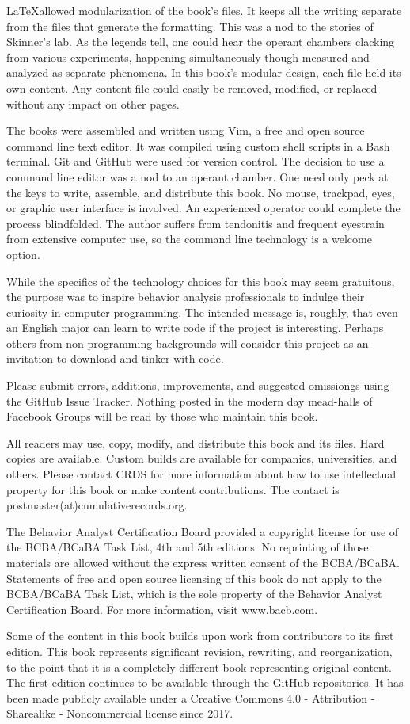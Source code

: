\LaTeX allowed modularization of the book's files. It keeps all the writing separate from the files that generate the formatting. This was a nod to the stories of Skinner's lab. As the legends tell, one could hear the operant chambers clacking from various experiments, happening simultaneously though measured and analyzed as separate phenomena. In this book's modular design, each file held its own content. Any content file could easily be removed, modified, or replaced without any impact on other pages.


The books were assembled and written using Vim, a free and open source command line text editor. It was compiled using custom shell scripts in a Bash terminal. Git and GitHub were used for version control. The decision to use a command line editor was a nod to an operant chamber. One need only peck at the keys to write, assemble, and distribute this book. No mouse, trackpad, eyes, or graphic user interface is involved. An experienced operator could complete the process blindfolded. The author suffers from tendonitis and frequent eyestrain from extensive computer use, so the command line technology is a welcome option.


While the specifics of the technology choices for this book may seem gratuitous, the purpose was to inspire behavior analysis professionals to indulge their curiosity in computer programming. The intended message is, roughly, that even an English major can learn to write code if the project is interesting. Perhaps others from non-programming backgrounds will consider this project as an invitation to download and tinker with code.

Please submit errors, additions, improvements, and suggested omissiongs using the GitHub Issue Tracker. Nothing posted in the modern day mead-halls of Facebook Groups will be read by those who maintain this book.

All readers may use, copy, modify, and distribute this book and its files. Hard copies are available. Custom builds are available for companies, universities, and others. Please contact CRDS for more information about how to use intellectual property for this book or make content contributions. The contact is postmaster(at)cumulativerecords.org.

The Behavior Analyst Certification Board provided a copyright license for use of the BCBA/BCaBA Task List, 4th and 5th editions. No reprinting of those materials are allowed without the express written consent of the BCBA/BCaBA. Statements of free and open source licensing of this book do not apply to the BCBA/BCaBA Task List, which is the sole property of the Behavior Analyst Certification Board. For more information, visit www.bacb.com.

Some of the content in this book builds upon work from contributors to its first edition. This book represents significant revision, rewriting, and reorganization, to the point that it is a completely different book representing original content. The first edition continues to be available through the GitHub repositories. It has been made publicly available under a Creative Commons 4.0 - Attribution - Sharealike - Noncommercial license since 2017.
\clearpage
